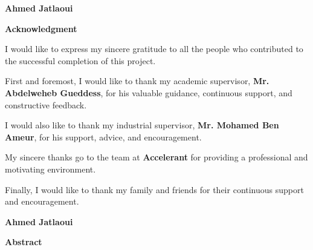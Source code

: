 \documentclass[12pt,a4paper]{report}
\begin{document}
\vfill

\begin{flushright}
\Large \textbf{Ahmed Jatlaoui}
\end{flushright}


\clearpage
\thispagestyle{empty}

\begin{center}
{\LARGE \textbf{Acknowledgment}}
\end{center}

\vspace{1cm}

\linespread{1.3}\selectfont
\large

I would like to express my sincere gratitude to all the people who contributed to the successful completion of this project.

\vspace{1cm}

First and foremost, I would like to thank my academic supervisor, \textbf{Mr. Abdelweheb Gueddess}, for his valuable guidance, continuous support, and constructive feedback.

\vspace{1cm}

I would also like to thank my industrial supervisor, \textbf{Mr. Mohamed Ben Ameur}, for his support, advice, and encouragement.

\vspace{1cm}

My sincere thanks go to the team at \textbf{Accelerant} for providing a professional and motivating environment.

\vspace{1cm}

Finally, I would like to thank my family and friends for their continuous support and encouragement.

\vfill

\begin{flushright}
\Large \textbf{Ahmed Jatlaoui}
\end{flushright}


\clearpage
\thispagestyle{empty}

\begin{center}
{\LARGE \textbf{Abstract}}
\end{center}

\vspace{1cm}

\linespread{1.3}\selectfont
\large
\end{document}
